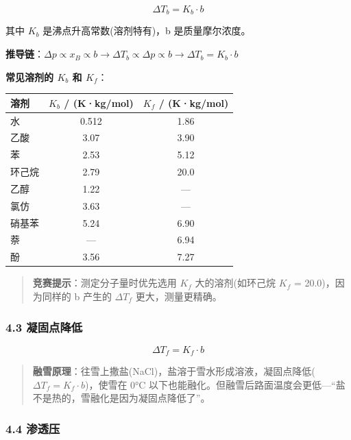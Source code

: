 \documentclass[a4paper,11pt]{ctexart}
\newcounter{none}
\newcommand{\箭}{\ensuremath{\rightarrow}}
\newcommand{\左箭}{\ensuremath{\leftarrow}}
\newcommand{\上箭}{\ensuremath{\uparrow}}
\newcommand{\下箭}{\ensuremath{\downarrow}}
\newcommand{\衡}{\ensuremath{\rightleftharpoons}}
\newcommand{\双箭}{\ensuremath{\leftrightarrow}}
\newcommand{\约等于}{\ensuremath{\approx}}
\newcommand{\小于等于}{\ensuremath{\leq}}
\newcommand{\大于等于}{\ensuremath{\geq}}
\newcommand{\不等于}{\ensuremath{\neq}}
\newcommand{\西格马}{\ensuremath{\sigma}}
\newcommand{\派}{\ensuremath{\pi}}
\begin{document}
\[
\boxed{\Delta T_b = K_b \cdot b}
\]

其中 \(K_b\) 是沸点升高常数(溶剂特有)，b 是质量摩尔浓度。

\textbf{推导链}：\(\Delta p \propto x_B \propto b \rightarrow \Delta T_b \propto \Delta p \propto b \rightarrow \Delta T_b = K_b \cdot b\)

\textbf{常见溶剂的 \(K_b\) 和 \(K_f\)}：

{\def\LTcaptype{none} %
\begin{longtable}[]{@{}lcc@{}}
\toprule\noalign{}
溶剂 & \(K_b\) / (K·kg/mol) & \(K_f\) / (K·kg/mol) \\
\midrule\noalign{}
\endhead
\bottomrule\noalign{}
\endlastfoot
水 & 0.512 & 1.86 \\
乙酸 & 3.07 & 3.90 \\
苯 & 2.53 & 5.12 \\
环己烷 & 2.79 & 20.0 \\
乙醇 & 1.22 & --- \\
氯仿 & 3.63 & --- \\
硝基苯 & 5.24 & 6.90 \\
萘 & --- & 6.94 \\
酚 & 3.56 & 7.27 \\
\end{longtable}
}

\begin{quote}
\textbf{竞赛提示}：测定分子量时优先选用 \(K_f\) 大的溶剂(如环己烷 \(K_f\) = 20.0)，因为同样的 b 产生的 \(\Delta T_f\) 更大，测量更精确。
\end{quote}

\subsubsection{4.3 凝固点降低}\label{ux51ddux56faux70b9ux964dux4f4e}

\[
\boxed{\Delta T_f = K_f \cdot b}
\]

\begin{quote}
\textbf{融雪原理}：往雪上撒盐(NaCl)，盐溶于雪水形成溶液，凝固点降低(\(\Delta T_f = K_f \cdot b\))，使雪在 0°C 以下也能融化。但融雪后路面温度会更低---``盐不是热的，雪融化是因为凝固点降低了''。
\end{quote}

\subsubsection{4.4 渗透压}\label{ux6e17ux900fux538b}
\end{document}
